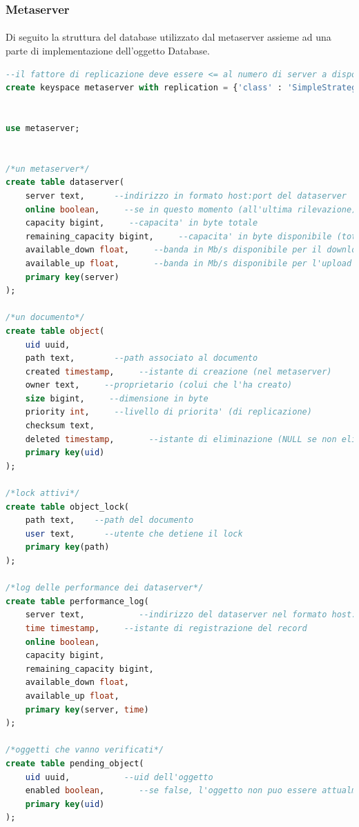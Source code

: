 \documentclass[11pt,a4paper,english]{article}
\begin{document}
\subsubsection{Metaserver}

\paragraph{} Di seguito la struttura del database utilizzato dal metaserver assieme ad una parte di implementazione dell'oggetto Database. 


\begin{lstlisting}[language=SQL, title=Struttura]
--il fattore di replicazione deve essere <= al numero di server a disposizione
create keyspace metaserver with replication = {'class' : 'SimpleStrategy', 'replication_factor' : 1};


use metaserver;


/*un metaserver*/
create table dataserver(
	server text,      --indirizzo in formato host:port del dataserver
	online boolean,     --se in questo momento (all'ultima rilevazione) e' online
	capacity bigint,     --capacita' in byte totale
	remaining_capacity bigint,     --capacita' in byte disponibile (totale-utilizzata)
	available_down float,     --banda in Mb/s disponibile per il download
	available_up float,       --banda in Mb/s disponibile per l'upload
	primary key(server)
);

/*un documento*/
create table object(
    uid uuid,
    path text,        --path associato al documento
    created timestamp,     --istante di creazione (nel metaserver)
    owner text,     --proprietario (colui che l'ha creato)
    size bigint,     --dimensione in byte
    priority int,     --livello di priorita' (di replicazione)
    checksum text,      
    deleted timestamp,       --istante di eliminazione (NULL se non eliminato)
    primary key(uid)
);

/*lock attivi*/
create table object_lock(
    path text,    --path del documento
    user text,      --utente che detiene il lock
    primary key(path)
);

/*log delle performance dei dataserver*/
create table performance_log(
    server text,           --indirizzo del dataserver nel formato host:port
    time timestamp,     --istante di registrazione del record
    online boolean,         
	capacity bigint,
	remaining_capacity bigint,
	available_down float,
	available_up float,
	primary key(server, time)
);

/*oggetti che vanno verificati*/
create table pending_object(
    uid uuid,           --uid dell'oggetto
    enabled boolean,       --se false, l'oggetto non puo essere attualmente processato perche' non e' disponibile o non sono disponibili server in cui replicarlo
    primary key(uid)
);


\end{lstlisting}
\end{document}
